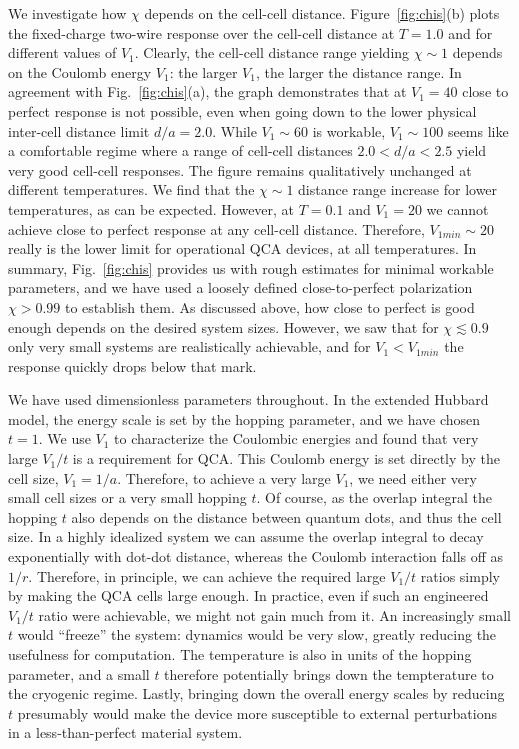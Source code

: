 We investigate how $\chi$ depends on the cell-cell distance.
Figure~\ref{fig:chis}(b) plots the fixed-charge two-wire response over the
cell-cell distance at $T = 1.0$ and for different values of $V_1$. Clearly, the
cell-cell distance range yielding $\chi \sim 1$ depends on the Coulomb energy
$V_1$: the larger $V_1$, the larger the distance range. In agreement with
Fig.~\ref{fig:chis}(a), the graph demonstrates that at $V_1 = 40$ close to
perfect response is not possible, even when going down to the lower physical
inter-cell distance limit $d/a = 2.0$. While $V_1 \sim 60$ is workable, $V_1
\sim 100$ seems like a comfortable regime where a range of cell-cell distances
$2.0 < d/a <2.5$ yield very good cell-cell responses. The figure remains
qualitatively unchanged at different temperatures. We find that the $\chi \sim
1$ distance range increase for lower temperatures, as can be expected. However,
at $T = 0.1$ and $V_1 = 20$ we cannot achieve close to perfect response at any
cell-cell distance.  Therefore, $V_{1min} \sim 20$ really is the lower limit for
operational QCA devices, at all temperatures. In summary, Fig.~\ref{fig:chis}
provides us with rough estimates for minimal workable parameters, and we have
used a loosely defined close-to-perfect polarization $\chi > 0.99$ to establish
them. As discussed above, how close to perfect is good enough depends on the
desired system sizes. However, we saw that for $\chi \lesssim 0.9$ only very
small systems are realistically achievable, and for $V_1 < V_{1min}$ the
response quickly drops below that mark.

We have used dimensionless parameters throughout. In the extended Hubbard model,
the energy scale is set by the hopping parameter, and we have chosen $t = 1$. We
use $V_1$ to characterize the Coulombic energies and found that very large
$V_1/t$ is a requirement for QCA. This Coulomb energy is set directly
by the cell size, $V_1 = 1/a$. Therefore, to achieve a very large
$V_1$, we need either very small cell sizes or a very small hopping $t$. Of
course, as the overlap integral the hopping $t$ also depends on the distance
between quantum dots, and thus the cell size. In a highly idealized system we
can assume the overlap integral to decay exponentially with dot-dot distance,
whereas the Coulomb interaction falls off as $1/r$. Therefore, in
principle, we can achieve the required large $V_1/t$ ratios simply by
making the QCA cells large enough. In practice, even if such an engineered
$V_1/t$ ratio were achievable, we might not gain much from it. An increasingly
small $t$ would ``freeze'' the system: dynamics would be very slow, greatly
reducing the usefulness for computation. The temperature is also in units of the
hopping parameter, and a small $t$ therefore potentially brings down the
tempterature to the cryogenic regime. Lastly, bringing down the overall energy
scales by reducing $t$ presumably would make the device more susceptible to
external perturbations in a less-than-perfect material system.

